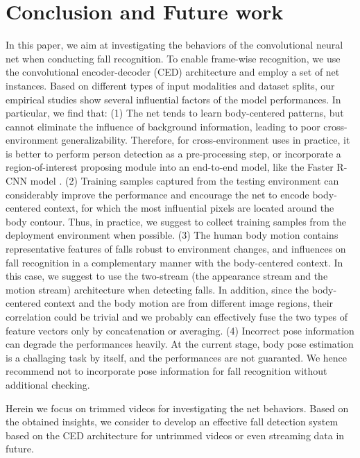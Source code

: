 \documentclass[runningheads]{llncs}
\begin{document}
\section{Conclusion and Future work}
\label{sec:conclusion}
In this paper, we aim at investigating the behaviors of the convolutional neural net when conducting fall recognition. To enable frame-wise recognition, we use the convolutional encoder-decoder (CED) architecture and employ a set of net instances. Based on different types of input modalities and dataset splits, our empirical studies show several influential factors of the model performances. In particular, we find that: (1) The net tends to learn body-centered patterns, but cannot eliminate the influence of background information, leading to poor cross-environment generalizability. Therefore, for cross-environment uses in practice, it is better to perform person detection as a pre-processing step, or incorporate a region-of-interest proposing module into an end-to-end model, like the Faster R-CNN model \cite{ren2015faster}.
(2) Training samples captured from the testing environment can considerably improve the performance and encourage the net to encode body-centered context, for which the most influential pixels are located around the body contour. Thus, in practice, we suggest to collect training samples from the deployment environment when possible. 
(3) The human body motion contains representative features of falls robust to environment changes, and influences on fall recognition in a complementary manner with the body-centered context. In this case, we suggest to use the two-stream (the appearance stream and the motion stream) architecture \cite{simonyan2014two} when detecting falls. In addition, since the body-centered context and the body motion are from different image regions, their correlation could be trivial and we probably can effectively fuse the two types of feature vectors only by concatenation or averaging. 
(4) Incorrect pose information can degrade the performances heavily. At the current stage, body pose estimation is a challaging task by itself, and the performances are not guaranted. We hence recommend not to incorporate pose information for fall recognition without additional checking. 


Herein we focus on trimmed videos for investigating the net behaviors. Based on the obtained insights, we consider to develop an effective fall detection system based on the CED architecture for untrimmed videos or even streaming data in future.
\end{document}
